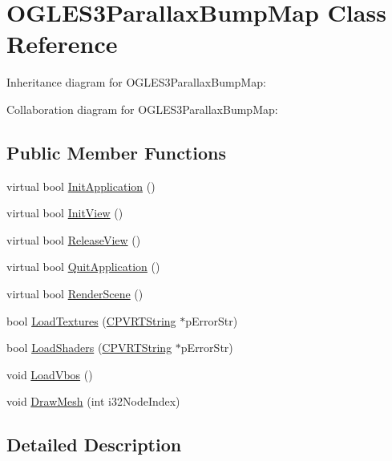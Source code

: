 \hypertarget{class_o_g_l_e_s3_parallax_bump_map}{\section{O\+G\+L\+E\+S3\+Parallax\+Bump\+Map Class Reference}
\label{class_o_g_l_e_s3_parallax_bump_map}
}


Inheritance diagram for O\+G\+L\+E\+S3\+Parallax\+Bump\+Map\+:


Collaboration diagram for O\+G\+L\+E\+S3\+Parallax\+Bump\+Map\+:
\subsection*{Public Member Functions}
\begin{DoxyCompactItemize}
\item 
virtual bool \hyperlink{class_o_g_l_e_s3_parallax_bump_map_a274ed77bc4da7d430e9d6a15f44a6440}{Init\+Application} ()
\item 
virtual bool \hyperlink{class_o_g_l_e_s3_parallax_bump_map_a85fffd0c212fff33a674564c75e4b585}{Init\+View} ()
\item 
virtual bool \hyperlink{class_o_g_l_e_s3_parallax_bump_map_ac5b847274cc67ea92ed65403b5247752}{Release\+View} ()
\item 
virtual bool \hyperlink{class_o_g_l_e_s3_parallax_bump_map_afc159db2b507da7f0871f27c22d00aee}{Quit\+Application} ()
\item 
virtual bool \hyperlink{class_o_g_l_e_s3_parallax_bump_map_a3cc2c32377d0b3aea3f672ee6c30177c}{Render\+Scene} ()
\item 
bool \hyperlink{class_o_g_l_e_s3_parallax_bump_map_a54365c487ca5f115c3a99146fa97a10d}{Load\+Textures} (\hyperlink{class_c_p_v_r_t_string}{C\+P\+V\+R\+T\+String} $\ast$p\+Error\+Str)
\item 
bool \hyperlink{class_o_g_l_e_s3_parallax_bump_map_a60f7fce431d57b0fa3374f848a3cdf8d}{Load\+Shaders} (\hyperlink{class_c_p_v_r_t_string}{C\+P\+V\+R\+T\+String} $\ast$p\+Error\+Str)
\item 
void \hyperlink{class_o_g_l_e_s3_parallax_bump_map_adaa63f71dba9326cb11cb2c97e7ae1b7}{Load\+Vbos} ()
\item 
void \hyperlink{class_o_g_l_e_s3_parallax_bump_map_af75d6a6ef060be9f7441597560141c33}{Draw\+Mesh} (int i32\+Node\+Index)
\end{DoxyCompactItemize}


\subsection{Detailed Description}


